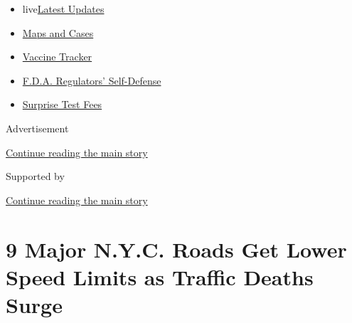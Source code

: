 \begin{itemize}
\tightlist
\item
  live\href{https://www.nytimes3xbfgragh.onion/2020/09/11/world/covid-19-coronavirus.html?name=styln-coronavirus-national\&region=TOP_BANNER\&block=storyline_menu_recirc\&action=click\&pgtype=Article\&impression_id=287a2690-f4c5-11ea-96bf-bf14b5b9665f\&variant=undefined}{Latest
  Updates}
\item
  \href{https://www.nytimes3xbfgragh.onion/interactive/2020/us/coronavirus-us-cases.html?name=styln-coronavirus-national\&region=TOP_BANNER\&block=storyline_menu_recirc\&action=click\&pgtype=Article\&impression_id=287a2691-f4c5-11ea-96bf-bf14b5b9665f\&variant=undefined}{Maps
  and Cases}
\item
  \href{https://www.nytimes3xbfgragh.onion/interactive/2020/science/coronavirus-vaccine-tracker.html?name=styln-coronavirus-national\&region=TOP_BANNER\&block=storyline_menu_recirc\&action=click\&pgtype=Article\&impression_id=287a2692-f4c5-11ea-96bf-bf14b5b9665f\&variant=undefined}{Vaccine
  Tracker}
\item
  \href{https://www.nytimes3xbfgragh.onion/2020/09/10/us/politics/fda-coronavirus-vaccine.html?name=styln-coronavirus-national\&region=TOP_BANNER\&block=storyline_menu_recirc\&action=click\&pgtype=Article\&impression_id=287a2693-f4c5-11ea-96bf-bf14b5b9665f\&variant=undefined}{F.D.A.
  Regulators' Self-Defense}
\item
  \href{https://www.nytimes3xbfgragh.onion/2020/09/09/upshot/coronavirus-surprise-test-fees.html?name=styln-coronavirus-national\&region=TOP_BANNER\&block=storyline_menu_recirc\&action=click\&pgtype=Article\&impression_id=287a2694-f4c5-11ea-96bf-bf14b5b9665f\&variant=undefined}{Surprise
  Test Fees}
\end{itemize}

Advertisement

\protect\hyperlink{after-top}{Continue reading the main story}

Supported by

\protect\hyperlink{after-sponsor}{Continue reading the main story}

\hypertarget{9-major-nyc-roads-get-lower-speed-limits-as-traffic-deaths-surge}{%
\section{9 Major N.Y.C. Roads Get Lower Speed Limits as Traffic Deaths
Surge}\label{9-major-nyc-roads-get-lower-speed-limits-as-traffic-deaths-surge}}

